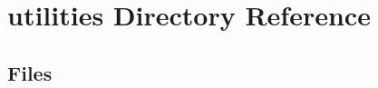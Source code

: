 \section{utilities Directory Reference}
\label{dir_df38b2a5d584e0f6066b4518b95c638b}
\subsection*{Files}
\begin{DoxyCompactItemize}
\end{DoxyCompactItemize}
